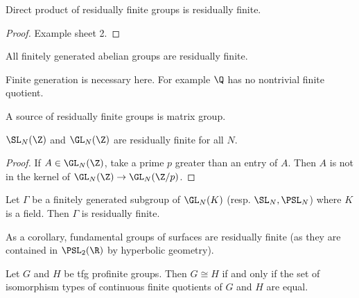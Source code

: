\documentclass[a4paper]{article}
\begin{document}
\begin{proposition}
  Direct product of residually finite groups is residually finite.
\end{proposition}

\begin{proof}
  Example sheet 2.
\end{proof}

\begin{proposition}
  All finitely generated abelian groups are residually finite.
\end{proposition}

\begin{remark}
  Finite generation is necessary here. For example \(\Q\) has no nontrivial finite quotient.
\end{remark}

A source of residually finite groups is matrix group.

\begin{proposition}
  \(\SL_N(\Z)\) and \(\GL_N(\Z)\) are residually finite for all \(N\).
\end{proposition}

\begin{proof}
  If \(A \in \GL_N(\Z)\), take a prime \(p\) greater than an entry of \(A\). Then \(A\) is not in the kernel of \(\GL_N(\Z) \to \GL_N(\Z/p)\).
\end{proof}

\begin{proposition}
  Let \(\Gamma\) be a finitely generated subgroup of \(\GL_N(K)\) (resp. \(\SL_N, \PSL_N\)) where \(K\) is a field. Then \(\Gamma\) is residually finite.
\end{proposition}

As a corollary, fundamental groups of surfaces are residually finite (as they are contained in \(\PSL_2(\R)\) by hyperbolic geometry).

\begin{theorem}
  Let \(G\) and \(H\) be tfg profinite groups. Then \(G \cong H\) if and only if the set of isomorphism types of continuous finite quotients of \(G\) and \(H\) are equal.
\end{theorem}
\end{document}
